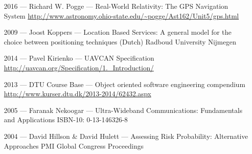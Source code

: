 \begin{thebibliography}{3}
    2016 --- Richard W. Pogge --- Real-World Relativity: The GPS Navigation System
    \url{http://www.astronomy.ohio-state.edu/~pogge/Ast162/Unit5/gps.html}

    2009 --- Joost Koppers --- Location Based Services: A general model for the choice between positioning techniques (Dutch)
    Radboud University Nijmegen

	2014 --- Pavel Kirienko --- UAVCAN Specification
	\url{http://uavcan.org/Specification/1._Introduction/}

    2013 --- DTU Course Base --- Object oriented software engineering compendium
    \url{http://www.kurser.dtu.dk/2013-2014/62432.aspx}

    2005 --- Faranak Nekoogar --- Ultra-Wideband Communications: Fundamentals and Applications
	ISBN-10: 0-13-146326-8

    2004 --- David Hillson \& David Hulett  --- Assessing Risk Probability: Alternative Approaches
    PMI Global Congress Proceedings


\end{thebibliography}

